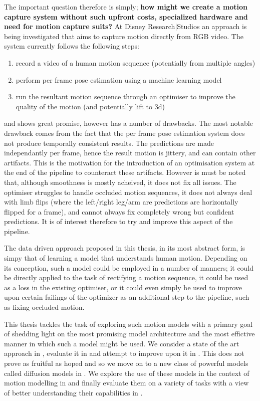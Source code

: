 The important question therefore is simply; \textbf{how might we create a motion capture system without such upfront costs, specialized hardware and need for motion capture suits?}
At Disney Research|Studios an approach is being investigated that aims to capture motion directly from RGB video. The system currently follows the following steps:
\begin{enumerate}
    \item record a video of a human motion sequence (potentially from multiple angles)
    \item perform per frame pose estimation using a machine learning model
    \item run the resultant motion sequence through an optimiser to improve the quality of the motion (and potentially lift to 3d)
\end{enumerate}
and shows great promise, however has a number of drawbacks.
The most notable drawback comes from the fact that the per frame pose estimation system does not produce temporally consistent results. The predictions are made independantly per frame, hence the result motion is jittery, and can contain other artifacts. This is the motivation for the introduction of an optimisation system at the end of the pipeline to counteract these artifacts. However is must be noted that, although smoothness is mostly acheived, it does not fix all issues. The optimiser struggles to handle occluded motion sequences, it does not always deal with limb flips (where the left/right leg/arm are predictions are horizontally flipped for a frame), and cannot always fix completely wrong but confident predictions. It is of interest therefore to try and improve this aspect of the pipeline.

The data driven approach proposed in this thesis, in its most abstract form, is simpy that of learning a model that understands human motion. Depending on its conception, such a model could be employed in a number of manners; it could be directly applied to the task of rectifying a motion sequence, it could be used as a loss in the existing optimiser, or it could even simply be used to improve upon certain failings of the optimizer as an additional step to the pipeline, such as fixing occluded motion.

This thesis tackles the task of exploring such motion models with a primary goal of shedding light on the most promising model architecture and the most effictive manner in which such a model might be used. We consider a state of the art approach in , evaluate it in  and attempt to improve upon it in . This does not prove as fruitful as hoped and so we move on to a new class of powerful models called diffusion models in . We explore the use of these models in the context of motion modelling in  and finally evaluate them on a variety of tasks with a view of better understanding their capabilities in .
